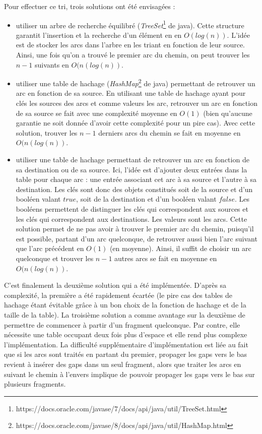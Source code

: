 \documentclass{article}
\begin{document}
Pour effectuer ce tri, trois solutions ont été envisagées :
\begin{itemize}
\item utiliser un arbre de recherche équilibré (\textit{TreeSet}\footnote{https://docs.oracle.com/javase/7/docs/api/java/util/TreeSet.html} de java). Cette structure garantit l'insertion et la recherche d'un élément en en $O(log(n))$. L'idée est de stocker les arcs dans l'arbre en les triant en fonction de leur source. Ainsi, une fois qu'on a trouvé le premier arc du chemin, on peut trouver les $n-1$ suivants en $O(n(log(n))$.

\item utiliser une table de hachage (\textit{HashMap}\footnote{\label{note1}https://docs.oracle.com/javase/8/docs/api/java/util/HashMap.html} de java) permettant de retrouver un arc en fonction de sa source. En utilisant une table de hachage ayant pour clés les sources des arcs et comme valeurs les arc, retrouver un arc en fonction de sa source se fait avec une complexité moyenne en $O(1)$ (bien qu'aucune garantie ne soit donnée d'avoir cette complexité pour un pire cas). Avec cette solution, trouver les $n-1$ derniers arcs du chemin se fait en moyenne en $O(n(log(n))$.

\item utiliser une table de hachage permettant de retrouver un arc en fonction de sa destination ou de sa source. Ici, l'idée est d'ajouter deux entrées dans la table pour chaque arc : une entrée associant cet arc à sa source et l'autre à sa destination. Les clés sont donc des objets constitués soit de la source et d'un booléen valant $true$, soit de la destination et d'un booléen valant $false$. Les booléens permettent de distinguer les clés qui correspondent aux sources et les clés qui correspondent aux destinations. Les valeurs sont les arcs. Cette solution permet de ne pas avoir à trouver le premier arc du chemin, puisqu'il est possible, partant d'un arc quelconque, de retrouver aussi bien l'arc suivant que l'arc précédent en $O(1)$ (en moyenne). Ainsi, il suffit de choisir un arc quelconque et trouver les $n-1$ autres arcs se fait en moyenne en $O(n(log(n))$.
\end{itemize}

C'est finalement la deuxième solution qui a été implémentée. D'après sa complexité, la première a été rapidement écartée (le pire cas des tables de hachage étant évitable grâce à un bon choix de la fonction de hachage et de la taille de la table). 
La troisième solution a comme avantage sur la deuxième de permettre de commencer à partir d'un fragment quelconque. Par contre, elle nécessite une table occupant deux fois plus d'espace et elle rend plus complexe l'implémentation. La difficulté supplémentaire d'implémentation est liée au fait que si les arcs sont traités en partant du premier, propager les gaps vers le bas revient à insérer des gaps dans un seul fragment, alors que traiter les arcs en suivant le chemin à l'envers implique de pouvoir propager les gaps vers le bas sur plusieurs fragments.
\end{document}

